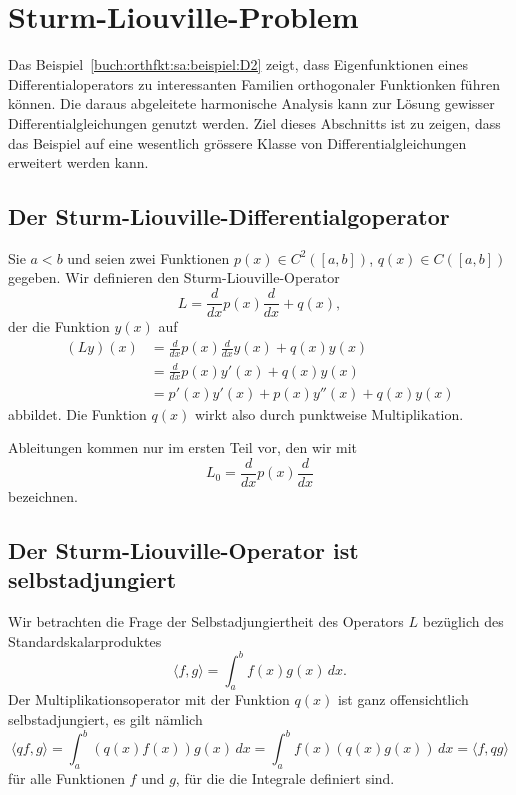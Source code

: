%
%
%
\section{Sturm-Liouville-Problem
\label{buch:orthofkt:section:sturmliouville}}
Das Beispiel~\ref{buch:orthfkt:sa:beispiel:D2} zeigt, dass
Eigenfunktionen eines Differentialoperators zu interessanten
Familien orthogonaler Funktionken führen können.
Die daraus abgeleitete harmonische Analysis kann zur Lösung
gewisser Differentialgleichungen genutzt werden.
Ziel dieses Abschnitts ist zu zeigen, dass das Beispiel auf
eine wesentlich grössere Klasse von Differentialgleichungen
erweitert werden kann.

%
%
\subsection{Der Sturm-Liouville-Differentialgoperator
\label{buch:orthofkt:sturmliouville:subsection:operator}}
Sie $a<b$ und seien zwei Funktionen
$p(x)\in C^2([a,b])$, $q(x)\in C([a,b])$ gegeben.
Wir definieren den Sturm-Liouville-Operator
\[
L = \frac{d}{dx} p(x) \frac{d}{dx} + q(x),
\]
der die Funktion $y(x)$ auf
\begin{align*}
(Ly)(x)
&=
\frac{d}{dx}p(x)\frac{d}{dx}y(x) + q(x)y(x)
\\
&=
\frac{d}{dx}p(x)y'(x) + q(x)y(x)
\\
&=
p'(x)y'(x)+p(x)y''(x)+q(x)y(x)
\end{align*}
abbildet.
Die Funktion $q(x)$ wirkt also durch punktweise Multiplikation.

Ableitungen kommen nur im ersten Teil vor, den wir mit
\[
L_0
=
\frac{d}{dx}p(x)\frac{d}{dx}
\]
bezeichnen.

%
%
\subsection{Der Sturm-Liouville-Operator ist selbstadjungiert}
Wir betrachten die Frage der Selbstadjungiertheit des
Operators $L$ bezüglich des Standardskalarproduktes
\[
\langle f,g\rangle
=
\int_a^b f(x)g(x)\,dx.
\]
Der Multiplikationsoperator mit der Funktion $q(x)$ ist ganz
offensichtlich selbstadjungiert, es gilt nämlich
\[
\langle qf,g\rangle
=
\int_a^b (q(x)f(x))g(x)\,dx
=
\int_a^b f(x)(q(x)g(x))\,dx
=
\langle f,qg\rangle
\]
für alle Funktionen $f$ und $g$, für die die Integrale definiert sind.

